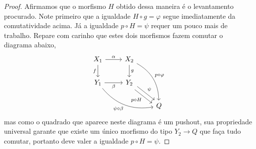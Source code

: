 \begin{proof}
  Afirmamos que o morfismo $H$ obtido dessa maneira é o levantamento procurado.
  Note primeiro que a igualdade $H \circ g = \varphi$ segue imediatamente da comutatividade acima.
  Já a igualdade $p \circ H = \psi$ requer um pouco mais de trabalho.
  Repare com carinho que estes dois morfismos fazem comutar o diagrama abaixo,
  \begin{displaymath}
    \begin{tikzcd}
      X_{1}
      \arrow[r, "\alpha"]
      \arrow[d, "f" swap]
      & X_{2}
      \arrow[d, "g"]
      \arrow[rdd, bend left=30, "p \circ \varphi"]
      \\ Y_{1}
      \arrow[r, "\beta" swap]
      \arrow[rrd, bend right=30, "\psi \circ \beta" swap]
      & Y_{2}
      \arrow[rd, shift left=1.2, "\psi"]
      \arrow[rd, shift right=1.2, "p \circ H" swap]
      \\ & & Q
    \end{tikzcd}
  \end{displaymath}
  mas como o quadrado que aparece neste diagrama é um pushout, sua propriedade universal garante que existe um único morfismo do tipo $Y_{2} \to Q$ que faça tudo comutar, portanto deve valer a igualdade $p \circ H = \psi$.


\end{proof}

